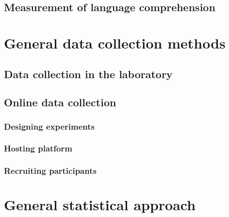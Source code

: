 \documentclass[a4paper, nobind]{templates/ociamthesis}
\begin{document}
\hypertarget{measurement-of-language-comprehension}{%
\section{Measurement of language comprehension}\label{measurement-of-language-comprehension}}

\hypertarget{general-data-collection-methods}{%
\chapter{General data collection methods}\label{general-data-collection-methods}}

\minitoc 

\hypertarget{data-collection-in-the-laboratory}{%
\section{Data collection in the laboratory}\label{data-collection-in-the-laboratory}}

\hypertarget{online-data-collection}{%
\section{Online data collection}\label{online-data-collection}}

\hypertarget{designing-experiments}{%
\subsection{Designing experiments}\label{designing-experiments}}

\hypertarget{hosting-platform}{%
\subsection{Hosting platform}\label{hosting-platform}}

\hypertarget{recruiting-participants}{%
\subsection{Recruiting participants}\label{recruiting-participants}}

\minitoc 

\hypertarget{general-statistical-approach}{%
\chapter{General statistical approach}\label{general-statistical-approach}}
\end{document}
